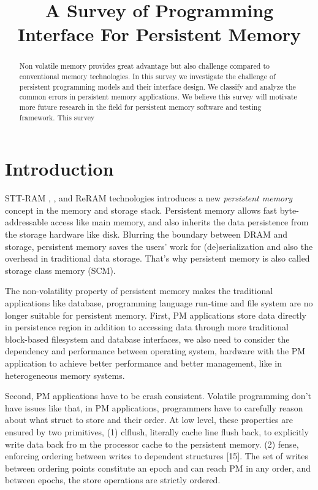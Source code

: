 \documentclass{sig-alternate}
\title{ A Survey of Programming Interface For Persistent Memory}
\author{}
\begin{document}
\maketitle
\thispagestyle{firstpage}
\pagestyle{plain}

\begin{abstract}
Non volatile memory provides great advantage but also challenge compared to conventional memory technologies. In this survey we investigate the challenge of persistent programming models and their interface design. We classify and analyze the common errors in persistent memory applications. We believe this survey will motivate more future research in the field for persistent memory software and testing framework.
This survey 

\end{abstract}

\section{Introduction}


STT-RAM \cite{4242474} \cite{6557176}, \cite{Moraru:2013:CDS:2524211.2524216} , and ReRAM \cite{5607274} technologies introduces a new \textit{persistent memory} concept in the memory and storage stack. Persistent memory allows fast byte-addressable access like main memory, and also inherits the data persistence from the storage hardware like disk. Blurring the boundary between DRAM and storage, persistent memory saves the users’ work for (de)serialization and also the overhead in traditional data storage. That’s why persistent memory is also called storage class memory (SCM).

The non-volatility property of persistent memory makes the traditional applications like database, programming language run-time and file system are no longer suitable for persistent memory. First, PM applications store data directly in persistence region in addition to accessing data through more traditional block-based filesystem and database interfaces, we also need to consider the dependency and performance between operating system, hardware with the PM application to achieve better performance and better management, like in heterogeneous memory systems.

	Second, PM applications have to be crash consistent. Volatile programming don’t have issues like that, in PM applications, programmers have to carefully reason about what struct to store and their order. At low level, these properties are ensured by two primitives, (1) clflush, literally cache line flush back, to explicitly write data back fro m the processor cache to the persistent memory. (2) fense, enforcing ordering between writes to dependent structures [15]. The set of writes between ordering points constitute an epoch \cite{Condit:2009:BIT:1629575.1629589} \cite{Pelley:2014:MP:2665671.2665712} and can reach PM in any order, and between epochs, the store operations are strictly ordered. 
\end{document}
